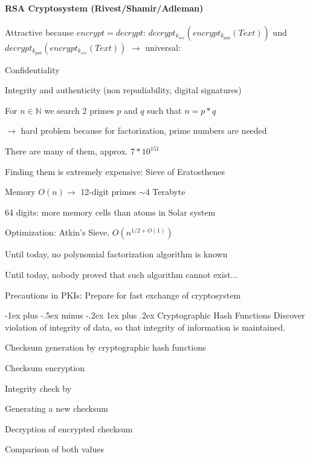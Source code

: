 \documentclass[a4paper]{article}
\makeatletter
\renewcommand{\subsubsection}{\@startsection{subsubsection}{3}{0mm}%
                {-1ex plus -.5ex minus -.2ex}%
                {1ex plus .2ex}%
                {\normalfont\small\bfseries}}
\makeatother
\begin{document}
\begin{multicols}{3}
    \paragraph{RSA Cryptosystem (Rivest/Shamir/Adleman)}
    Attractive because $encrypt=decrypt$: $decrypt_{k_{sec}}(encrypt_{k_{pub}}(Text))$ und $decrypt_{k_{pub}}(encrypt_{k_{sec}}(Text))$ $\rightarrow$ universal:
    \begin{enumerate*}
        \item Confidentiality
        \item Integrity and authenticity (non repudiability, digital signatures)
    \end{enumerate*}
    For $n\in\mathbb{N}$ we search 2 primes $p$ and $q$ such that $n=p*q$
    \begin{itemize*}
        \item[$\rightarrow$] hard problem because for factorization, prime numbers are needed
        \item There are many of them, approx. $7*10^{151}$
        \item Finding them is extremely expensive: Sieve of Eratosthenes
        \begin{itemize*}
            \item Memory $O(n)\rightarrow$ 12-digit primes $\sim 4$ Terabyte
            \item 64 digits: more memory cells than atoms in Solar system
        \end{itemize*}
        \item Optimization: Atkin’s Sieve, $O(n^{1/2+O(1)})$
        \item Until today, no polynomial factorization algorithm is known
        \item Until today, nobody proved that such algorithm cannot exist...
    \end{itemize*}
    Precautions in PKIs: Prepare for fast exchange of cryptosystem

    \subsubsection{Cryptographic Hash Functions}
    Discover violation of integrity of data, so that integrity of information is maintained.
    \begin{itemize*}
        \item Checksum generation by cryptographic hash functions
        \item Checksum encryption
        \item Integrity check by
        \begin{itemize*}
            \item Generating a new checksum
            \item Decryption of encrypted checksum
            \item Comparison of both values
        \end{itemize*}
    \end{itemize*}


\end{multicols}
\end{document}
